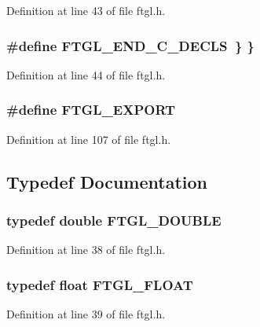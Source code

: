 Definition at line 43 of file ftgl.h.
\subsubsection[{FTGL\_\-END\_\-C\_\-DECLS}]{\setlength{\rightskip}{0pt plus 5cm}\#define FTGL\_\-END\_\-C\_\-DECLS~\} \}}\label{ftgl_8h_ba8b33a81b5c655eb7c4b358419a17d5}




Definition at line 44 of file ftgl.h.
\subsubsection[{FTGL\_\-EXPORT}]{\setlength{\rightskip}{0pt plus 5cm}\#define FTGL\_\-EXPORT}\label{ftgl_8h_e472b08d77a4ead09abe74fe37220270}




Definition at line 107 of file ftgl.h.

\subsection{Typedef Documentation}
\subsubsection[{FTGL\_\-DOUBLE}]{\setlength{\rightskip}{0pt plus 5cm}typedef double {\bf FTGL\_\-DOUBLE}}\label{ftgl_8h_e792fb2619b3890381a8b68babbdac74}




Definition at line 38 of file ftgl.h.
\subsubsection[{FTGL\_\-FLOAT}]{\setlength{\rightskip}{0pt plus 5cm}typedef float {\bf FTGL\_\-FLOAT}}\label{ftgl_8h_d08e479bb6a0dbe611100e8549d55a1b}




Definition at line 39 of file ftgl.h.